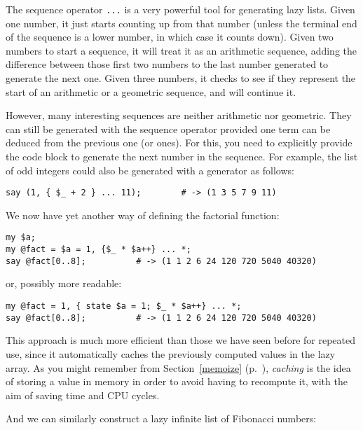 The sequence operator \verb'...' is a very powerful tool 
for generating lazy lists. Given one number, it just 
starts counting up from that number (unless the 
terminal end of the sequence is a lower number, 
in which case it counts down). Given two numbers 
to start a sequence, it will treat it as an arithmetic 
sequence, adding the difference between those first 
two numbers to the last number generated to generate 
the next one. Given three numbers, it checks to see 
if they represent the start of an arithmetic or a 
geometric sequence, and will continue it.

However, many interesting sequences are neither arithmetic 
nor geometric.  They can still be generated with the 
sequence operator provided one term can be deduced from 
the previous one (or ones). For this, you need to explicitly 
provide the code block to generate the next number in 
the sequence. For example, the list of odd integers 
could also be generated with a generator as follows:

\begin{verbatim}
say (1, { $_ + 2 } ... 11);        # -> (1 3 5 7 9 11)
\end{verbatim}

We now have yet another way of defining the factorial 
function:

\begin{verbatim}
my $a;
my @fact = $a = 1, {$_ * $a++} ... *;
say @fact[0..8];          # -> (1 1 2 6 24 120 720 5040 40320)
\end{verbatim}

or, possibly more readable:

\begin{verbatim}
my @fact = 1, { state $a = 1; $_ * $a++} ... *;
say @fact[0..8];          # -> (1 1 2 6 24 120 720 5040 40320)
\end{verbatim}


This approach is much more efficient than those we have 
seen before for repeated use, since it automatically 
caches the previously computed values in the lazy array. 
As you might remember from Section~\ref{memoize} 
(p.~\pageref{memoize}), \emph{caching} is the idea of 
storing a value in memory in order to avoid having to 
recompute it, with the aim of saving time and CPU cycles.

And we can similarly construct a lazy infinite list of 
Fibonacci numbers:

